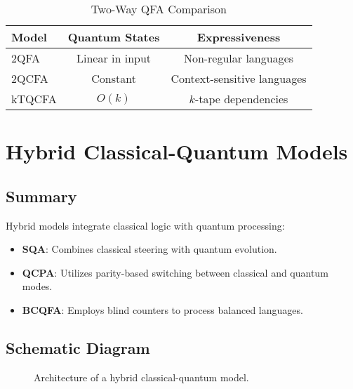 \begin{table}[ht]
\centering
\caption{Two-Way QFA Comparison}
\label{tab:two_way}
\begin{tabular}{|l|c|c|}
\hline
\textbf{Model} & \textbf{Quantum States} & \textbf{Expressiveness} \\ \hline
2QFA  & Linear in input & Non-regular languages \\ \hline
2QCFA & Constant & Context-sensitive languages \\ \hline
kTQCFA & $O(k)$ & $k$-tape dependencies \\ \hline
\end{tabular}
\end{table}

\section{Hybrid Classical-Quantum Models}

\subsection{Summary}
Hybrid models integrate classical logic with quantum processing:
\begin{itemize}
    \item \textbf{SQA}: Combines classical steering with quantum evolution.
    \item \textbf{QCPA}: Utilizes parity-based switching between classical and quantum modes.
    \item \textbf{BCQFA}: Employs blind counters to process balanced languages.
\end{itemize}

\subsection{Schematic Diagram}
\begin{figure}[ht]
\centering
{}
\caption{Architecture of a hybrid classical-quantum model.}
\label{fig:hybrid}
\end{figure}

